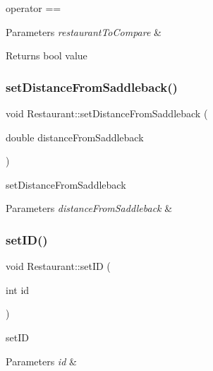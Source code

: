 operator == 


\begin{DoxyParams}{Parameters}
{\em restaurant\+To\+Compare} & \\
\hline
\end{DoxyParams}
\begin{DoxyReturn}{Returns}
bool value 
\end{DoxyReturn}
\mbox{\label{class_restaurant_a12aea2979807bd2132f16f706b634ad4}} 
\subsubsection{\texorpdfstring{set\+Distance\+From\+Saddleback()}{setDistanceFromSaddleback()}}
{\footnotesize\ttfamily void Restaurant\+::set\+Distance\+From\+Saddleback (\begin{DoxyParamCaption}\item[{double}]{distance\+From\+Saddleback }\end{DoxyParamCaption})}



set\+Distance\+From\+Saddleback 


\begin{DoxyParams}{Parameters}
{\em distance\+From\+Saddleback} & \\
\hline
\end{DoxyParams}
\mbox{\label{class_restaurant_a156dd173f171f1f170191dadb7153b8f}} 
\subsubsection{\texorpdfstring{set\+I\+D()}{setID()}}
{\footnotesize\ttfamily void Restaurant\+::set\+ID (\begin{DoxyParamCaption}\item[{int}]{id }\end{DoxyParamCaption})}



set\+ID 


\begin{DoxyParams}{Parameters}
{\em id} & \\
\hline
\end{DoxyParams}
\mbox{\label{class_restaurant_aa4a36310566791865760329edb61dfef}} 
